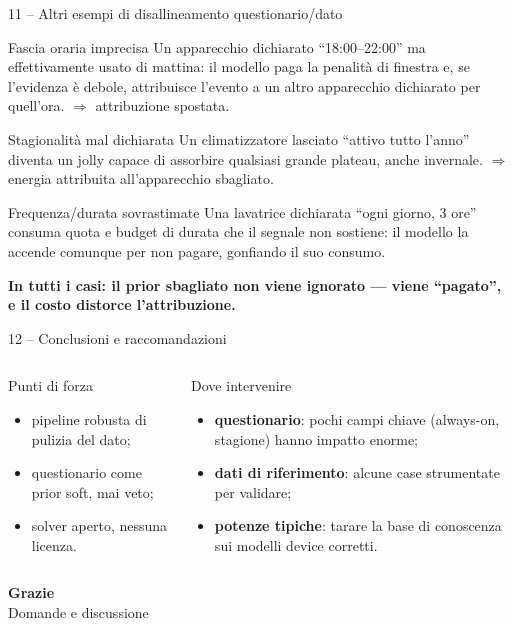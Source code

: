 \documentclass[aspectratio=169]{beamer}
\begin{document}
\begin{frame}{11 -- Altri esempi di disallineamento questionario/dato}
  \begin{block}{Fascia oraria imprecisa}
    \small
    Un apparecchio dichiarato ``18:00--22:00'' ma effettivamente usato di mattina: il modello paga
    la penalit\`a di finestra e, se l'evidenza \`e debole, attribuisce l'evento a un altro
    apparecchio dichiarato per quell'ora. $\Rightarrow$ attribuzione spostata.
  \end{block}
  \begin{block}{Stagionalit\`a mal dichiarata}
    \small
    Un climatizzatore lasciato ``attivo tutto l'anno'' diventa un jolly capace di assorbire qualsiasi
    grande plateau, anche invernale. $\Rightarrow$ energia attribuita all'apparecchio
    sbagliato.
  \end{block}
  \begin{block}{Frequenza/durata sovrastimate}
    \small
    Una lavatrice dichiarata ``ogni giorno, 3 ore'' consuma quota e budget di durata che il segnale
    non sostiene: il modello la accende comunque per non pagare, gonfiando il suo consumo.
  \end{block}
  \vspace{0.1em}
  \centering\small\color{CorpGray}
  \textbf{In tutti i casi: il prior sbagliato non viene ignorato --- viene ``pagato'', e il costo
  distorce l'attribuzione.}
\end{frame}

\begin{frame}{12 -- Conclusioni e raccomandazioni}
  \begin{columns}[T]
    \begin{exampleblock}{Punti di forza}
      \small
      \begin{itemize}
        \item pipeline robusta di pulizia del dato;
        \item questionario come prior soft, mai veto;
        \item solver aperto, nessuna licenza.
      \end{itemize}
    \end{exampleblock}
    \begin{alertblock}{Dove intervenire}
      \small
      \begin{itemize}
        \item \textbf{questionario}: pochi campi chiave (always-on, stagione) hanno impatto enorme;
        \item \textbf{dati di riferimento}: alcune case strumentate per validare;
        \item \textbf{potenze tipiche}: tarare la base di conoscenza sui modelli device corretti.
      \end{itemize}
    \end{alertblock}
  \end{columns}

\end{frame}

\begin{frame}[plain]
  \centering
  \vspace{2cm}
  {\Huge\bfseries\color{CorpBlue} Grazie}\\[0.6cm]
  {\large\color{CorpGray} Domande e discussione}
\end{frame}
\end{document}

